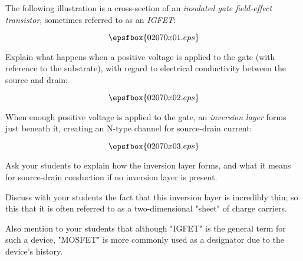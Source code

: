 

The following illustration is a cross-section of an {\it insulated gate field-effect transistor}, sometimes referred to as an {\it IGFET}:

$$\epsfbox{02070x01.eps}$$

Explain what happens when a positive voltage is applied to the gate (with reference to the substrate), with regard to electrical conductivity between the source and drain:

$$\epsfbox{02070x02.eps}$$







When enough positive voltage is applied to the gate, an {\it inversion layer} forms just beneath it, creating an N-type channel for source-drain current:

$$\epsfbox{02070x03.eps}$$







Ask your students to explain how the inversion layer forms, and what it means for source-drain conduction if no inversion layer is present.

Discuss with your students the fact that this inversion layer is incredibly thin; so this that it is often referred to as a two-dimensional "sheet" of charge carriers.

Also mention to your students that although "IGFET" is the general term for such a device, "MOSFET" is more commonly used as a designator due to the device's history.




